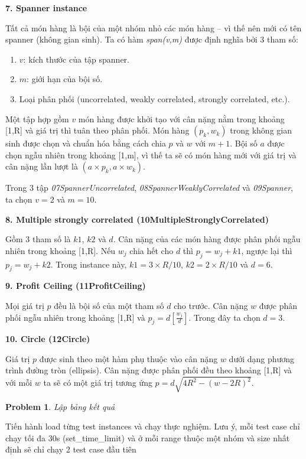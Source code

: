 \documentclass[12pt]{article}
\newtheorem{problem}{Problem}
\begin{document}
\hspace{-1em}\textbf{7. Spanner instance}

Tất cả món hàng là bội của một nhóm nhỏ các món hàng – vì thế nên mới có tên spanner (không gian sinh). Ta có hàm \textit{span(v,m)} được định nghĩa bởi 3 tham số:
\begin{enumerate}
    \item $v$: kích thước của tập spanner.
    \item $m$: giới hạn của bội số.
    \item Loại phân phối (uncorrelated, weakly correlated, strongly correlated, etc.).
\end{enumerate}

Một tập hợp gồm $v$ món hàng được khởi tạo với cân nặng nằm trong khoảng [1,R] và giá trị thì tuân theo phân phối. Món hàng $(p_k, w_k)$ trong không gian sinh được chọn và chuẩn hóa bằng cách chia $p$ và $w$ với $m + 1$. Bội số $a$ được chọn ngẫu nhiên trong khoảng [1,m], vì thế ta sẽ có món hàng mới với giá trị và cân nặng lần lượt là $(a \times p_k, a \times w_k)$.

Trong 3 tập \textit{07SpannerUncorrelated}, \textit{08SpannerWeaklyCorrelated} và \textit{09Spanner}, ta chọn $v = 2$ và $m = 10$.

\hspace{-1em}\textbf{8. Multiple strongly correlated (10MultipleStronglyCorrelated)}

Gồm 3 tham số là $k1$, $k2$ và $d$. Cân nặng của các món hàng được phân phối ngẫu nhiên trong khoảng [1,R]. Nếu $w_j$ chia hết cho $d$ thì $p_j = w_j + k1$, ngược lại thì $p_j = w_j + k2$. Trong instance này, $k1 = 3 \times R/10$, $k2 = 2 \times R/10$ và $d = 6$.

\hspace{-1em}\textbf{9. Profit Ceiling (11ProfitCeiling)}

Mọi giá trị $p$ đều là bội số của một tham số $d$ cho trước. Cân nặng $w$ được phân phối ngẫu nhiên trong khoảng [1,R] và $p_j = d\left[\frac{w_j}{d}\right]$. Trong đây ta chọn $d = 3$.

\hspace{-1em}\textbf{10. Circle (12Circle)}

Giá trị $p$ được sinh theo một hàm phụ thuộc vào cân nặng $w$ dưới dạng phương trình đường tròn (ellipsis). Cân nặng được phân phối đều theo khoảng [1,R] và với mỗi $w$ ta sẽ có một giá trị tương ứng $p = d\sqrt{4R^2 - (w - 2R)^2}$.


\begin{problem}
	Lập bảng kết quả
\end{problem}
\lstset{style=mystyle}
	Tiến hành load từng test instances và chạy thực nghiệm. Lưu ý, mỗi test case chỉ chạy tối đa 30s (set\_time\_limit) và ở mỗi range thuộc một nhóm và size nhất định sẽ chỉ chạy 2 test case đầu tiên\\
\end{document}
